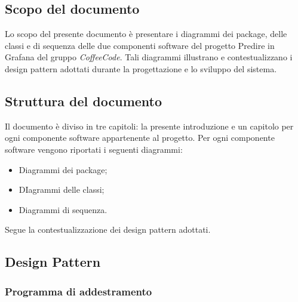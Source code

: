 \documentclass[../specifica-tecnica.tex]{subfiles}
\begin{document}
\subsection{Scopo del documento}
Lo scopo del presente documento è presentare i diagrammi dei package, delle classi e di sequenza delle due componenti software del progetto
Predire in Grafana del gruppo \emph{CoffeeCode}. Tali diagrammi illustrano e contestualizzano i design pattern adottati durante la progettazione
e lo sviluppo del sistema.

\subsection{Struttura del documento}
Il documento è diviso in tre capitoli: la presente introduzione e un capitolo per ogni componente software appartenente al progetto.
Per ogni componente software vengono riportati i seguenti diagrammi:
\begin{itemize}
  \item Diagrammi dei package;
  \item DIagrammi delle classi;
  \item Diagrammi di sequenza.
\end{itemize}
Segue la contestualizzazione dei design pattern adottati.

\subsection{Design Pattern}
\subsubsection{Programma di addestramento}
\end{document}
